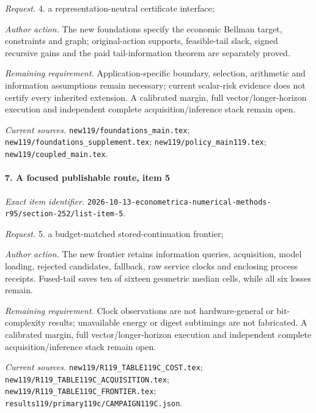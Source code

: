 \par\emph{Request.} 4. a representation-neutral certificate interface;

\par\emph{Author action.} The new foundations specify the economic Bellman target, constraints and graph; original-action supports, feasible-tail slack, signed recursive gains and the paid tail-information theorem are separately proved.

\par\emph{Remaining requirement.} Application-specific boundary, selection, arithmetic and information assumptions remain necessary; current scalar-risk evidence does not certify every inherited extension. A calibrated margin, full vector/\allowbreak{}longer-horizon execution and independent complete acquisition/\allowbreak{}inference stack remain open.

\par\emph{Current sources.} \nolinkurl{new119/foundations_main.tex}; \nolinkurl{new119/foundations_supplement.tex}; \nolinkurl{new119/policy_main119.tex}; \nolinkurl{new119/coupled_main.tex}.

\paragraph{7. A focused publishable route, item 5}

\emph{Exact item identifier.} \nolinkurl{2026-10-13-econometrica-numerical-methods-r95/section-252/list-item-5}.

\par\emph{Request.} 5. a budget-matched stored-continuation frontier;

\par\emph{Author action.} The new frontier retains information queries, acquisition, model loading, rejected candidates, fallback, raw service clocks and enclosing process receipts. Fused-tail saves ten of sixteen geometric median cells, while all six losses remain.

\par\emph{Remaining requirement.} Clock observations are not hardware-general or bit-complexity results; unavailable energy or digest subtimings are not fabricated. A calibrated margin, full vector/\allowbreak{}longer-horizon execution and independent complete acquisition/\allowbreak{}inference stack remain open.

\par\emph{Current sources.} \nolinkurl{new119/R119_TABLE119C_COST.tex}; \nolinkurl{new119/R119_TABLE119C_ACQUISITION.tex}; \nolinkurl{new119/R119_TABLE119C_FRONTIER.tex}; \nolinkurl{results119/primary119c/CAMPAIGN119C.json}.

